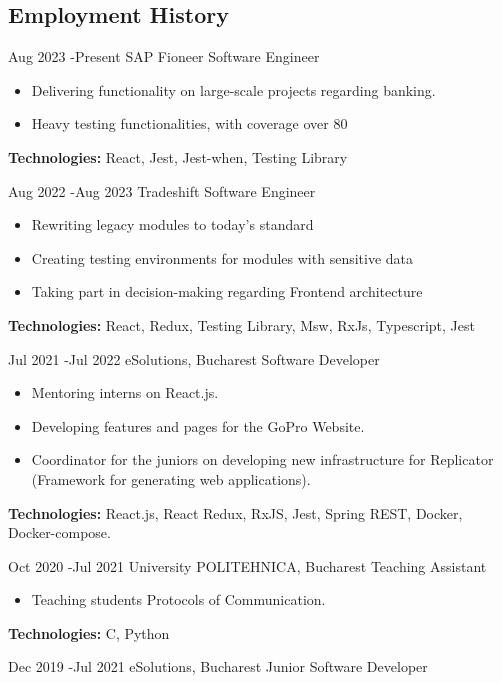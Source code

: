 \documentclass[9pt]{article}
\begin{document}
\begin{paracol}{2}

\section{Employment History}
        \job
		{Aug 2023 -}{Present}
		{SAP Fioneer}
		{Software Engineer}
		{
			\begin{itemize}
				\item Delivering functionality on large-scale projects regarding banking.
                    \item Heavy testing functionalities, with coverage over 80%
			\end{itemize}
			\rule{0mm}{5mm}\textbf{Technologies:} React, Jest, Jest-when, Testing Library
		}
        \job
		{Aug 2022 -}{Aug 2023}
		{Tradeshift}
		{Software Engineer}
		{
			\begin{itemize}
				\item Rewriting legacy modules to today's standard
                    \item Creating testing environments for modules with sensitive data  
                    \item Taking part in decision-making regarding Frontend architecture
			\end{itemize}
			\rule{0mm}{5mm}\textbf{Technologies:} React, Redux, Testing Library, Msw, RxJs, Typescript, Jest
		}  
	\job
		{Jul 2021 -}{Jul 2022}
		{eSolutions, Bucharest}
		{Software Developer}
		{
			\begin{itemize}
				\item Mentoring interns on React.js.
				\item Developing features and pages for the GoPro Website.
				\item Coordinator for the juniors on developing new infrastructure for Replicator (Framework for generating web applications).
			\end{itemize}
			\rule{0mm}{5mm}\textbf{Technologies:} React.js, React Redux, RxJS, Jest, Spring REST, Docker, Docker-compose.
            }
        \job
		{Oct 2020 -}{Jul 2021}
		{University POLITEHNICA, Bucharest}
		{Teaching Assistant}
		{
			\begin{itemize}
				\item Teaching students Protocols of Communication.
			\end{itemize}
			\rule{0mm}{5mm}\textbf{Technologies:} C, Python
		}
	\switchcolumn
	\job
		{Dec 2019 -}{Jul 2021}
		{eSolutions, Bucharest}
		{Junior Software Developer}

\end{paracol}
\end{document}
